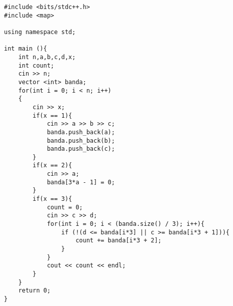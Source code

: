 \begin{verbatim}
#include <bits/stdc++.h>
#include <map>

using namespace std;

int main (){
	int n,a,b,c,d,x;
	int count;
	cin >> n;
	vector <int> banda;
	for(int i = 0; i < n; i++)
	{
		cin >> x;
		if(x == 1){
			cin >> a >> b >> c;
			banda.push_back(a);
			banda.push_back(b);
			banda.push_back(c);
		}
		if(x == 2){
			cin >> a;
			banda[3*a - 1] = 0;
		}
		if(x == 3){
			count = 0;
			cin >> c >> d;
			for(int i = 0; i < (banda.size() / 3); i++){
				if (!(d <= banda[i*3] || c >= banda[i*3 + 1])){
					count += banda[i*3 + 2];
				}
			}
			cout << count << endl;
		}
	}
	return 0;
}
\end{verbatim}

